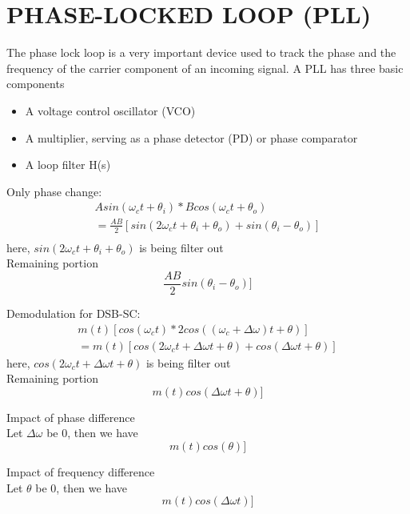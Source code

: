 \section{PHASE-LOCKED LOOP (PLL)}
The phase lock loop is a very important device used to track the phase and the frequency of the carrier component of an incoming signal. A PLL has three basic components

\begin{itemize}
    \item A voltage control oscillator (VCO)
    \item A multiplier, serving as a phase detector (PD)
    or phase comparator
    \item A loop filter H(s)
\end{itemize}

Only phase change:
\begin{equation}
    \begin{split}
        Asin(\omega_ct+\theta_i) * Bcos(\omega_ct+\theta_o)\\
        =\frac{AB}{2}[sin(2\omega_ct+\theta_i+\theta_o) + sin(\theta_i-\theta_o)]\\
    \end{split}
\end{equation}
here, $sin(2\omega_ct+\theta_i+\theta_o)$ is being filter out \\
Remaining portion
\begin{equation}
    \frac{AB}{2}sin(\theta_i-\theta_o)]
\end{equation}

Demodulation for DSB-SC:
\begin{equation}
    \begin{split}
        m(t)[cos(\omega_ct) * 2cos((\omega_c+\Delta\omega)t+\theta)]\\
        =m(t)[cos(2\omega_ct+\Delta\omega t+\theta) + cos(\Delta\omega t+\theta)]
    \end{split}
\end{equation}
here, $cos(2\omega_ct+\Delta\omega t+\theta)$ is being filter out \\
Remaining portion
\begin{equation}
    m(t)cos(\Delta\omega t+\theta)]
\end{equation}

Impact of phase difference\\
Let $\Delta\omega$ be 0, then we have
\begin{equation}
    m(t)cos(\theta)]
\end{equation}

Impact of frequency difference\\
Let $\theta$ be 0, then we have
\begin{equation}
    m(t)cos(\Delta\omega t)]
\end{equation}
